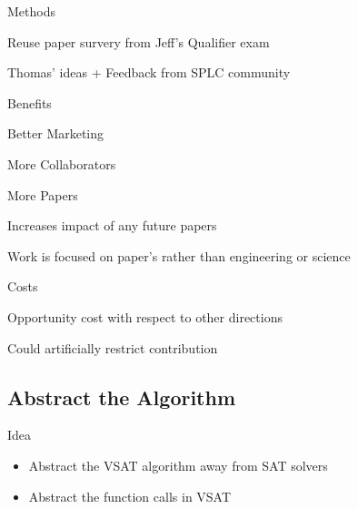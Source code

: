 \documentclass[presentation]{beamer}
\begin{document}
\begin{frame}[label={sec:org32f856c}]{Methods}
\begin{block}{Reuse paper survery from Jeff's Qualifier exam}
\end{block}

\begin{block}{Thomas' ideas + Feedback from SPLC community}
\end{block}
\end{frame}

\begin{frame}[label={sec:orge196c4f}]{Benefits}
\begin{block}{Better Marketing}
\end{block}

\begin{block}{More Collaborators}
\end{block}

\begin{block}{More Papers}
\end{block}

\begin{block}{Increases impact of any future papers}
\end{block}

\begin{block}{Work is focused on paper's rather than engineering or science}
\end{block}
\end{frame}

\begin{frame}[label={sec:org979dea1}]{Costs}
\begin{block}{Opportunity cost with respect to other directions}
\end{block}

\begin{block}{Could artificially restrict contribution}
\end{block}
\end{frame}

\subsection{Abstract the Algorithm}
\label{sec:org3697f00}

\begin{frame}[label={sec:orge5f0d29}]{Idea}
\begin{itemize}
\item Abstract the VSAT algorithm away from SAT solvers
\item Abstract the function calls in VSAT
\end{itemize}
\end{frame}
\end{document}
